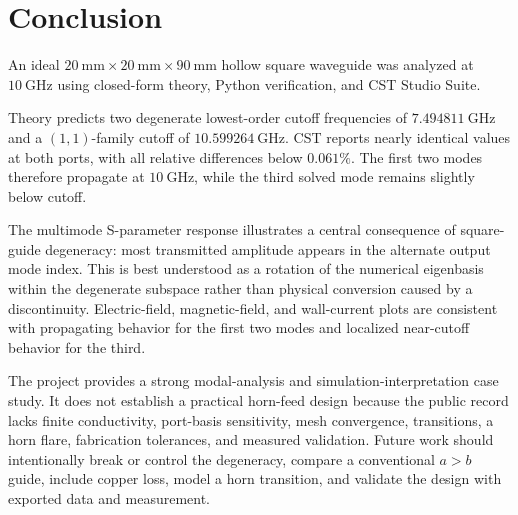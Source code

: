 \section{Conclusion}
\label{sec:conclusion}

An ideal \(20~\mathrm{mm}\times20~\mathrm{mm}\times90~\mathrm{mm}\) hollow square waveguide was analyzed at \(10~\mathrm{GHz}\) using closed-form theory, Python verification, and CST Studio Suite.

Theory predicts two degenerate lowest-order cutoff frequencies of \(7.494811~\mathrm{GHz}\) and a \((1,1)\)-family cutoff of \(10.599264~\mathrm{GHz}\). CST reports nearly identical values at both ports, with all relative differences below \(0.061\%\). The first two modes therefore propagate at \(10~\mathrm{GHz}\), while the third solved mode remains slightly below cutoff.

The multimode S-parameter response illustrates a central consequence of square-guide degeneracy: most transmitted amplitude appears in the alternate output mode index. This is best understood as a rotation of the numerical eigenbasis within the degenerate subspace rather than physical conversion caused by a discontinuity. Electric-field, magnetic-field, and wall-current plots are consistent with propagating behavior for the first two modes and localized near-cutoff behavior for the third.

The project provides a strong modal-analysis and simulation-interpretation case study. It does not establish a practical horn-feed design because the public record lacks finite conductivity, port-basis sensitivity, mesh convergence, transitions, a horn flare, fabrication tolerances, and measured validation. Future work should intentionally break or control the degeneracy, compare a conventional \(a>b\) guide, include copper loss, model a horn transition, and validate the design with exported data and measurement.
